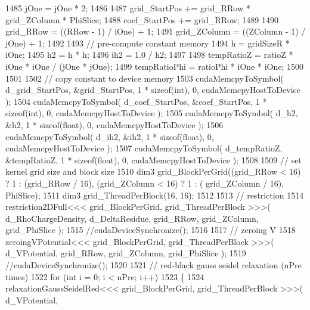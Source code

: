 \begin{DoxyCode}
1485             jOne = jOne * 2;
1486 
1487             grid\_StartPos += grid\_RRow * grid\_ZColumn * PhiSlice;
1488             coef\_StartPos += grid\_RRow;
1489 
1490             grid\_RRow       = ((RRow - 1) / iOne) + 1;
1491             grid\_ZColumn    = ((ZColumn - 1) / jOne) + 1;
1492 
1493             \textcolor{comment}{// pre-compute constant memory}
1494             h   = gridSizeR * iOne;
1495             h2  = h * h;
1496             ih2 = 1.0 / h2;
1497 
1498             tempRatioZ = ratioZ * iOne * iOne / (jOne * jOne);
1499             tempRatioPhi = ratioPhi * iOne * iOne;
1500 
1501 
1502             \textcolor{comment}{// copy constant to device memory}
1503             cudaMemcpyToSymbol( d\_grid\_StartPos, &grid\_StartPos, 1 * \textcolor{keyword}{sizeof}(\textcolor{keywordtype}{int}), 0, cudaMemcpyHostToDevice
       );
1504             cudaMemcpyToSymbol( d\_coef\_StartPos, &coef\_StartPos, 1 * \textcolor{keyword}{sizeof}(\textcolor{keywordtype}{int}), 0, cudaMemcpyHostToDevice
       );
1505             cudaMemcpyToSymbol( d\_h2, &h2, 1 * \textcolor{keyword}{sizeof}(\textcolor{keywordtype}{float}), 0, cudaMemcpyHostToDevice );
1506             cudaMemcpyToSymbol( d\_ih2, &ih2, 1 * \textcolor{keyword}{sizeof}(\textcolor{keywordtype}{float}), 0, cudaMemcpyHostToDevice );
1507             cudaMemcpyToSymbol( d\_tempRatioZ, &tempRatioZ, 1 * \textcolor{keyword}{sizeof}(\textcolor{keywordtype}{float}), 0, cudaMemcpyHostToDevice );
1508 
1509             \textcolor{comment}{// set kernel grid size and block size}
1510             dim3 grid\_BlockPerGrid((grid\_RRow < 16) ? 1 : (grid\_RRow / 16), (grid\_ZColumn < 16) ? 1 : (
      grid\_ZColumn / 16), PhiSlice);
1511             dim3 grid\_ThreadPerBlock(16, 16);
1512 
1513             \textcolor{comment}{// restriction}
1514             restriction2DFull<<< grid\_BlockPerGrid, grid\_ThreadPerBlock >>>( d\_RhoChargeDensity, 
      d\_DeltaResidue, grid\_RRow, grid\_ZColumn, grid\_PhiSlice );
1515             \textcolor{comment}{//cudaDeviceSynchronize();}
1516 
1517             \textcolor{comment}{// zeroing V}
1518             zeroingVPotential<<< grid\_BlockPerGrid, grid\_ThreadPerBlock >>>( d\_VPotential, grid\_RRow, 
      grid\_ZColumn, grid\_PhiSlice );
1519             \textcolor{comment}{//cudaDeviceSynchronize();}
1520 
1521             \textcolor{comment}{// red-black gauss seidel relaxation (nPre times)}
1522             \textcolor{keywordflow}{for} (\textcolor{keywordtype}{int} i = 0; i < nPre; i++)
1523             \{
1524                 relaxationGaussSeidelRed<<< grid\_BlockPerGrid, grid\_ThreadPerBlock >>>( d\_VPotential, 

\end{DoxyCode}
